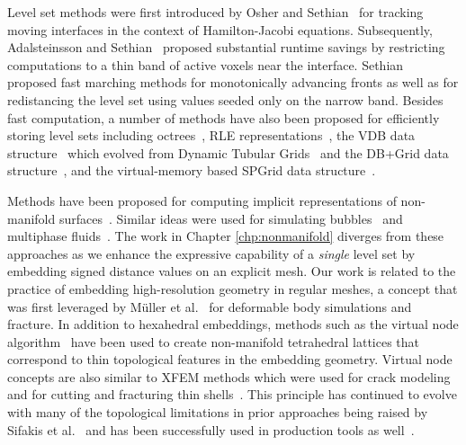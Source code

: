 Level set methods were first introduced by Osher and
Sethian~ for tracking moving interfaces in the
context of Hamilton-Jacobi equations.  Subsequently, Adalsteinsson and
Sethian~ proposed substantial runtime savings
by restricting computations to a thin band of active voxels near the
interface.  Sethian~ proposed fast marching
methods for monotonically advancing fronts as well as for redistancing
the level set using values seeded only on the narrow band.  Besides
fast computation, a number of methods have also been proposed for
efficiently storing level sets including octrees~\citep{LosasGF:2004},
RLE representations~\citep{HoustNBNM:2006,IrvinGLF:2006,ChentM:2011},
the VDB data structure~\citep{Muset:2013} which evolved from Dynamic
Tubular Grids~\citep{NielsM:2006} and the DB+Grid data
structure~\citep{Muset:2011}, and the virtual-memory based SPGrid data
structure~\citep{SetalABS:2014}.

Methods have been proposed for computing implicit representations of
non-manifold surfaces~\citep{BloomF:1995,YuanYW:2012}. Similar ideas
were used for simulating bubbles~\citep{ZhengYP:2006} and multiphase
fluids~\citep{LosasSSF:2006}. The work in Chapter \ref{chp:nonmanifold}
diverges from these approaches as we enhance the expressive capability
of a \emph{single} level set by embedding signed distance values on an
explicit mesh. Our work is related to the practice of embedding
high-resolution geometry in regular meshes, a concept that was first
leveraged by M\"{u}ller et al.~ for deformable
body simulations and fracture.  In addition to hexahedral embeddings,
methods such as the virtual node algorithm~\citep{MolinBF:2004} have
been used to create non-manifold tetrahedral lattices that correspond
to thin topological features in the embedding geometry. Virtual node
concepts are also similar to XFEM methods which were used for crack
modeling~\citep{MoeesDB:1999} and for cutting and fracturing thin
shells~\citep{KaufmMBGG:2009}. This principle has continued to evolve
with many of the topological limitations in prior approaches being
raised by Sifakis et al.~ and has been
successfully used in production tools as well~\citep{HellrSSST:2009}.


